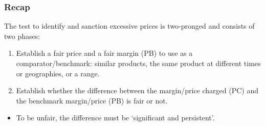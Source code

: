     \subsubsection{Recap}

        The test to identify and sanction excessive prices is two-pronged and consists of two phases:
        
        \begin{enumerate}
            \item Establish a fair price and a fair margin (PB) to use as a comparator/benchmark: similar products, the same product at different times or geographies, or a range.
            \item Establish whether the difference between the margin/price charged (PC) and the benchmark margin/price (PB) is fair or not.
        \end{enumerate}
        
        \begin{itemize}
            \item To be unfair, the difference must be ‘significant and persistent’.
        \end{itemize}


